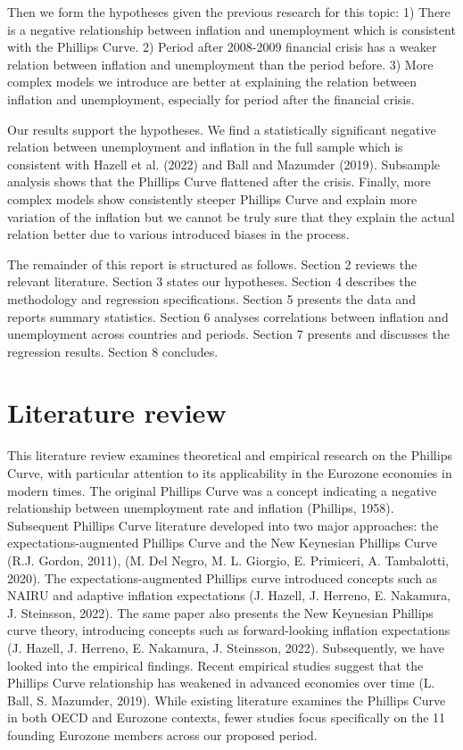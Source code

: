 \documentclass[preprint,10pt,authoryear]{elsarticle}
\begin{document}
Then we form the hypotheses given the previous research for this topic: 1) There is a negative relationship between inflation and unemployment which is consistent with the Phillips Curve. 2) Period after 2008-2009 financial crisis has a weaker relation between inflation and unemployment than the period before. 3) More complex models we introduce are better at explaining the relation between inflation and unemployment, especially for period after the financial crisis.

Our results support the hypotheses. We find a  statistically significant negative relation between unemployment and inflation in the full sample which is consistent with Hazell et al. (2022) and Ball and Mazumder (2019). Subsample analysis shows that the Phillips Curve flattened after the crisis. Finally, more complex models show consistently steeper Phillips Curve and explain more variation of the inflation but we cannot be truly sure that they explain the actual relation better due to various introduced biases in the process.

The remainder of this report is structured as follows. Section 2 reviews the relevant literature. Section 3 states our hypotheses. Section 4 describes the methodology and regression specifications. Section 5 presents the data and reports summary statistics. Section 6 analyses correlations between inflation and unemployment across countries and periods. Section 7 presents and discusses the regression results. Section 8 concludes.

\section{Literature review}

This literature review examines theoretical and empirical research on the Phillips Curve, with particular attention to its applicability in the Eurozone economies in modern times. The original Phillips Curve was a concept indicating a negative relationship between unemployment rate and inflation (Phillips, 1958). Subsequent Phillips Curve literature developed into two major approaches: the expectations-augmented Phillips Curve and the New Keynesian Phillips Curve (R.J. Gordon, 2011), (M. Del Negro, M. L. Giorgio, E. Primiceri, A. Tambalotti, 2020). The expectations-augmented Phillips curve introduced concepts such as NAIRU and adaptive inflation expectations (J. Hazell, J. Herreno, E. Nakamura, J. Steinsson, 2022). The same paper also presents the New Keynesian Phillips curve theory, introducing concepts such as forward-looking inflation expectations (J. Hazell, J. Herreno, E. Nakamura, J. Steinsson, 2022).
Subsequently, we have looked into the empirical findings. Recent empirical studies suggest that the Phillips Curve relationship has weakened in advanced economies over time (L. Ball, S. Mazumder, 2019). While existing literature examines the Phillips Curve in both OECD and Eurozone contexts, fewer studies focus specifically on the 11 founding Eurozone members across our proposed period.
\end{document}
